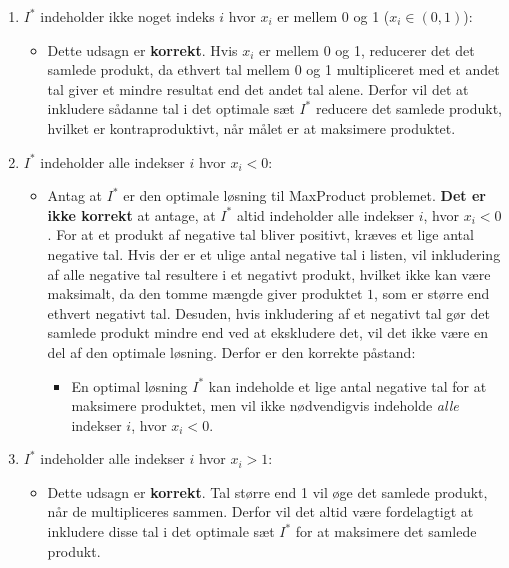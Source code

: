 \documentclass{article}
\begin{document}
\begin{enumerate}
    \item $I^*$ indeholder ikke noget indeks $i$ hvor $x_i$ er mellem 0 og 1 ($x_i \in (0,1)$):
    \begin{itemize}
        \item Dette udsagn er \textbf{korrekt}. Hvis $x_i$ er mellem 0 og 1, reducerer det det samlede produkt, da ethvert tal mellem 0 og 1 multipliceret med et andet tal giver et mindre resultat end det andet tal alene. Derfor vil det at inkludere sådanne tal i det optimale sæt $I^*$ reducere det samlede produkt, hvilket er kontraproduktivt, når målet er at maksimere produktet.
    \end{itemize}
    
    \item $I^*$ indeholder alle indekser $i$ hvor $x_i < 0$:
    \begin{itemize}
        \item Antag at $I^*$ er den optimale løsning til MaxProduct problemet. \textbf{Det er ikke korrekt} at antage, at $I^*$ altid indeholder alle indekser $i$, hvor $x_i < 0$. For at et produkt af negative tal bliver positivt, kræves et lige antal negative tal. Hvis der er et ulige antal negative tal i listen, vil inkludering af alle negative tal resultere i et negativt produkt, hvilket ikke kan være maksimalt, da den tomme mængde giver produktet $1$, som er større end ethvert negativt tal. Desuden, hvis inkludering af et negativt tal gør det samlede produkt mindre end ved at ekskludere det, vil det ikke være en del af den optimale løsning. Derfor er den korrekte påstand: 

\begin{itemize}
    \item En optimal løsning $I^*$ kan indeholde et lige antal negative tal for at maksimere produktet, men vil ikke nødvendigvis indeholde \textit{alle} indekser $i$, hvor $x_i < 0$.
\end{itemize}

    \end{itemize}
    
    \item $I^*$ indeholder alle indekser $i$ hvor $x_i > 1$:
    \begin{itemize}
        \item Dette udsagn er \textbf{korrekt}. Tal større end 1 vil øge det samlede produkt, når de multipliceres sammen. Derfor vil det altid være fordelagtigt at inkludere disse tal i det optimale sæt $I^*$ for at maksimere det samlede produkt.
    \end{itemize}
    

\end{enumerate}
\end{document}
